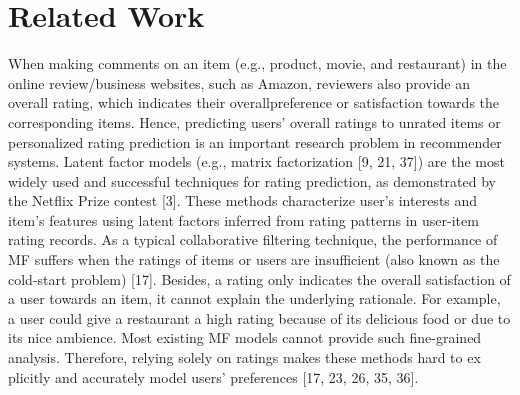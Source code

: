 \documentclass[10pt,conference]{IEEEtran}
\begin{document}
\section{Related Work}
When making comments on an ite​m (e.g., product, movie, and restaurant) in the online review/business websites, such​ as Amazon, reviewers also provide an overall rating, which indicates their overall ​preference or satisfaction towards the corresponding items. Hence, predicting users​' overall ratings to unrated items or personalized rating prediction is an import​ant research problem in recommender systems. Latent factor models (e.g., matrix fa​ctorization [9, 21, 37]) are the most widely used and successful techniques for rati​ng prediction, as demonstrated by the Netflix Prize contest [3]. These methods cha​racterize user's interests and item's features using latent factors inferred from r​ating patterns in user-item rating records. As a typical collaborative filtering techni​que, the performance of MF suffers when the ratings of items or users are insufficien​t (also known as the cold-start problem) [17]. Besides, a rating only indicates the ov​erall satisfaction of a user towards an item, it cannot explain the underlying rationa​le. For example, a user could give a restaurant a high rating because of its deliciou​s food or due to its nice ambience. Most existing MF models cannot provide such fin​e-grained analysis. Therefore, relying solely on ratings makes these methods hard to ex​plicitly and accurately model users' preferences [17, 23, 26, 35, 36].
\end{document}
